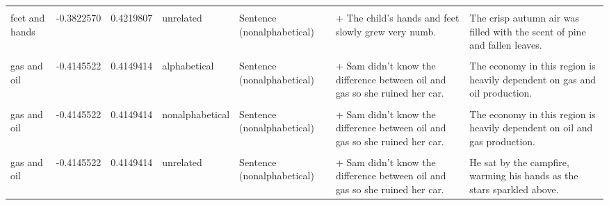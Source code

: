 \documentclass[
  12pt,
]{scrartcl}
\begin{document}
\begin{landscape}
\begin{longtable}{lrrllll}
\cellcolor{gray!6}{feet and hands} & \cellcolor{gray!6}{-0.3822570} & \cellcolor{gray!6}{0.4219807} & \cellcolor{gray!6}{unrelated} & \cellcolor{gray!6}{Sentence (alphabetical)} & \cellcolor{gray!6}{+ The child's feet and hands slowly grew very numb.} & \cellcolor{gray!6}{The crisp autumn air was filled with the scent of pine and fallen leaves.}\\
feet and hands & -0.3822570 & 0.4219807 & unrelated & Sentence (nonalphabetical) & + The child's hands and feet slowly grew very numb. & The crisp autumn air was filled with the scent of pine and fallen leaves.\\
\addlinespace
\cellcolor{gray!6}{gas and oil} & \cellcolor{gray!6}{-0.4145522} & \cellcolor{gray!6}{0.4149414} & \cellcolor{gray!6}{alphabetical} & \cellcolor{gray!6}{Sentence (alphabetical)} & \cellcolor{gray!6}{+ Sam didn't know the difference between gas and oil so she ruined her car.} & \cellcolor{gray!6}{The economy in this region is heavily dependent on gas and oil production.}\\
gas and oil & -0.4145522 & 0.4149414 & alphabetical & Sentence (nonalphabetical) & + Sam didn't know the difference between oil and gas so she ruined her car. & The economy in this region is heavily dependent on gas and oil production.\\
\cellcolor{gray!6}{gas and oil} & \cellcolor{gray!6}{-0.4145522} & \cellcolor{gray!6}{0.4149414} & \cellcolor{gray!6}{nonalphabetical} & \cellcolor{gray!6}{Sentence (alphabetical)} & \cellcolor{gray!6}{+ Sam didn't know the difference between gas and oil so she ruined her car.} & \cellcolor{gray!6}{The economy in this region is heavily dependent on oil and gas production.}\\
gas and oil & -0.4145522 & 0.4149414 & nonalphabetical & Sentence (nonalphabetical) & + Sam didn't know the difference between oil and gas so she ruined her car. & The economy in this region is heavily dependent on oil and gas production.\\
\cellcolor{gray!6}{gas and oil} & \cellcolor{gray!6}{-0.4145522} & \cellcolor{gray!6}{0.4149414} & \cellcolor{gray!6}{unrelated} & \cellcolor{gray!6}{Sentence (alphabetical)} & \cellcolor{gray!6}{+ Sam didn't know the difference between gas and oil so she ruined her car.} & \cellcolor{gray!6}{He sat by the campfire, warming his hands as the stars sparkled above.}\\
\addlinespace
gas and oil & -0.4145522 & 0.4149414 & unrelated & Sentence (nonalphabetical) & + Sam didn't know the difference between oil and gas so she ruined her car. & He sat by the campfire, warming his hands as the stars sparkled above.\\

\end{longtable}
\end{landscape}
\end{document}
